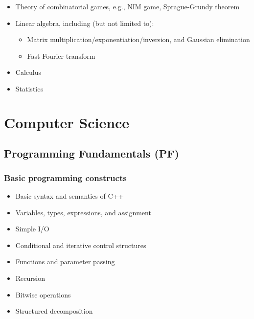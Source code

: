 \documentclass[12pt]{article}
\begin{document}
		\begin{itemize}[label=]
			\item Theory of combinatorial games, e.g., NIM game, Sprague-Grundy theorem
			\item Linear algebra, including (but not limited to):
				\begin{itemize}[label=$\bullet$,leftmargin=12pt,topsep=-\parskip]
					\item Matrix multiplication/exponentiation/inversion, and Gaussian elimination
					\item Fast Fourier transform
				\end{itemize}
			\item Calculus
			\item Statistics
		\end{itemize}
	
	\section{Computer Science}
	\subsection{Programming Fundamentals (PF)}
		\renewcommand{\type}{PF}
		\subsubsection{Basic programming constructs}
		\begin{itemize}[label=]
			\item Basic syntax and semantics of C++
			\item Variables, types, expressions, and assignment
			\item Simple I/O
			\item Conditional and iterative control structures
			\item Functions and parameter passing
			\item Recursion
			\item Bitwise operations
			\item Structured decomposition
		\end{itemize}
		
\end{document}
